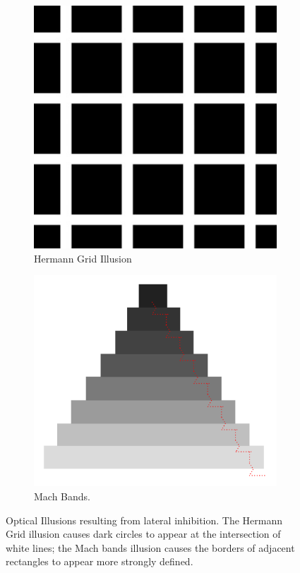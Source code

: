 \documentclass[11pt]{isuthesis}
\begin{document}
\begin{figure}
\centering
\begin{subfigure}[b]{.45\textwidth}
  \centering
  \includegraphics[width=\textwidth]{Figure/LitReview/HermannGrid}
  \caption{\small Hermann Grid Illusion \label{fig:hermanngrid}}
\end{subfigure}\hfill
\begin{subfigure}[b]{.45\textwidth}
  \centering
  \includegraphics[width=\textwidth]{Figure/LitReview/MachBands}
  \caption{\small Mach Bands. 
  \label{fig:machbands}}
\end{subfigure}
\caption[Inhibition Illusions]{Optical Illusions resulting from lateral inhibition. The Hermann Grid illusion causes dark circles to appear at the intersection of white lines; the Mach bands illusion causes the borders of adjacent rectangles to appear more strongly defined.} \label{fig:InhibitionIllusions}
\end{figure}
\end{document}
